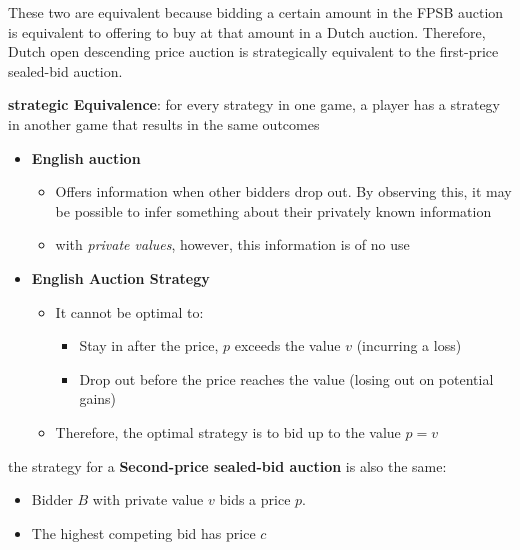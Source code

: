 \documentclass[11pt,a4paper,titlepage,dvipsnames,cmyk]{scrartcl}
\begin{document}
These two are equivalent because bidding a certain amount in the FPSB auction is equivalent to offering to buy at that amount in a Dutch auction. Therefore, Dutch open descending price auction is strategically equivalent to the first-price sealed-bid auction.

\begin{tcolorbox}
\begin{center}
    \textbf{strategic Equivalence}: for every strategy in one game, a player has a strategy in another game that results in the same outcomes
\end{center}
\end{tcolorbox}

\begin{itemize}
    \item \textbf{English auction}
    \begin{itemize}
        \item Offers information when other bidders drop out. By observing this, it may be possible to infer something about their privately known information
        \item with \textit{private values}, however, this information is of no use
    \end{itemize}
    \item \textbf{English Auction Strategy}
    \begin{itemize}
        \item It cannot be optimal to:
        \begin{itemize}
            \item Stay in after the price, $p$ exceeds the value $v$ (incurring a loss)
            \item Drop out before the price reaches the value (losing out on potential gains)
        \end{itemize}
        \item Therefore, the optimal strategy is to bid up to the value $p = v$
    \end{itemize}
\end{itemize}

the strategy for a \textbf{Second-price sealed-bid auction} is also the same:
\begin{itemize}
    \item Bidder $B$ with private value $v$ bids a price $p$.
    \item The highest competing bid has price $c$
\end{itemize}
\end{document}
